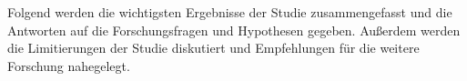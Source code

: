 Folgend werden die wichtigsten Ergebnisse der Studie zusammengefasst und die Antworten auf die Forschungsfragen und Hypothesen gegeben. Außerdem werden die Limitierungen der Studie diskutiert und Empfehlungen für die weitere Forschung nahegelegt.